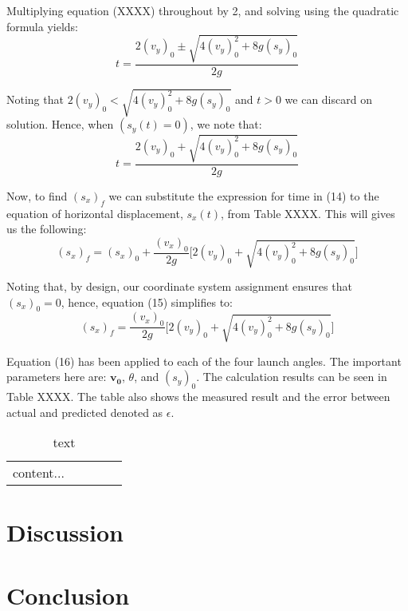 \documentclass[a4paper]{article}
\begin{document}
Multiplying equation (XXXX) throughout by 2, and solving using the quadratic formula yields:
\begin{equation}
t = \frac{2(v_y)_0 \pm \sqrt{4(v_y)_0^2 + 8g(s_y)_0}}{2g}
\end{equation} 

Noting that $2(v_y)_0 < \sqrt{4(v_y)_0^2 + 8g(s_y)_0}$ and $t>0$ we can discard on solution. Hence, when $(s_y(t) = 0)$, we note that:
\begin{equation}
t = \frac{2(v_y)_0 + \sqrt{4(v_y)_0^2 + 8g(s_y)_0}}{2g}
\end{equation}

Now, to find $(s_x)_f$ we can substitute the expression for time in (14) to the equation of horizontal displacement, $s_x(t)$, from Table XXXX. This will gives us the following:
\begin{equation}
(s_x)_f = (s_x)_0 + \frac{(v_x)_0}{2g} \bigg[2(v_y)_0 + \sqrt{4(v_y)_0^2 + 8g(s_y)_0}\bigg]
\end{equation}

Noting that, by design, our coordinate system assignment ensures that $(s_x)_0 = 0$, hence, equation (15) simplifies to:
\begin{equation}
(s_x)_f = \frac{(v_x)_0}{2g} \bigg[2(v_y)_0 + \sqrt{4(v_y)_0^2 + 8g(s_y)_0}\bigg]
\end{equation}

Equation (16) has been applied to each of the four launch angles. The important parameters here are: $\boldsymbol{v_0}$, $\theta$, and $(s_y)_0$. The calculation results can be seen in Table XXXX. The table also shows the measured result and the error between actual and predicted denoted as $\epsilon$.
\begin{table}[h]
	\centering
	\caption{text}
	\begin{tabular}{rrrrr}
		content...
	\end{tabular}
\end{table}

\section{Discussion}


\section{Conclusion}



\end{document}

